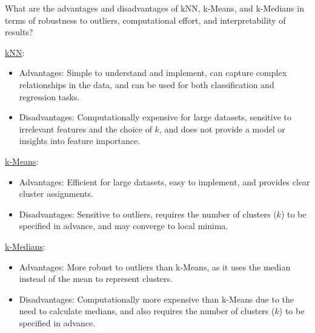 \begin{ejercicio}
    What are the advantages and disadvantages of kNN, k-Means, and k-Medians in terms of robustness to outliers, computational effort, and interpretability of results?
    \begin{description}
        \item \ul{kNN}:
        \begin{itemize}
            \item Advantages: Simple to understand and implement, can capture complex relationships in the data, and can be used for both classification and regression tasks.
            \item Disadvantages: Computationally expensive for large datasets, sensitive to irrelevant features and the choice of $k$, and does not provide a model or insights into feature importance.
        \end{itemize}

        \item \ul{k-Means}:
        \begin{itemize}
            \item Advantages: Efficient for large datasets, easy to implement, and provides clear cluster assignments.
            \item Disadvantages: Sensitive to outliers, requires the number of clusters ($k$) to be specified in advance, and may converge to local minima.
        \end{itemize}

        \item \ul{k-Medians}:
        \begin{itemize}
            \item Advantages: More robust to outliers than k-Means, as it uses the median instead of the mean to represent clusters.
            \item Disadvantages: Computationally more expensive than k-Means due to the need to calculate medians, and also requires the number of clusters ($k$) to be specified in advance.
        \end{itemize}
    \end{description}
\end{ejercicio}
